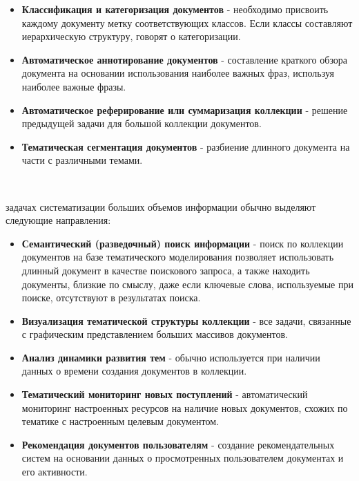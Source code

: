 \begin{itemize}
    \item \textbf{Классификация и категоризация документов} - необходимо присвоить каждому документу метку соответствующих классов. Если классы составляют иерархическую структуру, говорят о категоризации.
    \item \textbf{Автоматическое аннотирование документов} - составление краткого обзора документа на основании использования наиболее важных фраз, используя наиболее важные фразы.
    \item \textbf{Автоматическое реферирование или суммаризация коллекции} - решение предыдущей задачи для большой коллекции документов.
    \item \textbf{Тематическая сегментация документов} - разбиение длинного документа на части с различными темами.
\end{itemize}

~\

 задачах систематизации больших объемов информации обычно выделяют следующие направления:

\begin{itemize}
    \item \textbf{Семантический (разведочный) поиск информации} - поиск по коллекции документов на базе тематического моделирования позволяет использовать длинный документ в качестве поискового запроса, а также находить документы, близкие по смыслу, даже если ключевые слова, используемые при поиске, отсутствуют в результатах поиска.
    \item \textbf{Визуализация тематической структуры коллекции} - все задачи, связанные с графическим представлением больших массивов документов.
    \item \textbf{Анализ динамики развития тем} - обычно используется при наличии данных о времени создания документов в коллекции.
    \item \textbf{Тематический мониторинг новых поступлений} - автоматический мониторинг настроенных ресурсов на наличие новых документов, схожих по тематике с настроенным целевым документом.
    \item \textbf{Рекомендация документов пользователям} - создание рекомендательных систем на основании данных о просмотренных пользователем документах и его активности.
\end{itemize}

%
